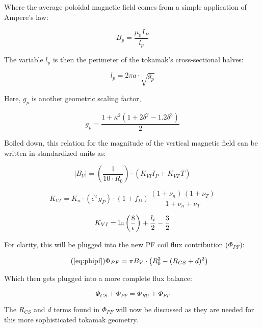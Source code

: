 Where the average poloidal magnetic field comes from a simple application of Ampere's law:

\begin{equation}
	\overline{B_p} = \frac{\mu_0 I_P}{l_p}
\end{equation}

The variable $l_p$ is then the perimeter of the tokamak's cross-sectional halves:

\begin{equation}
	l_p = 2 \pi a \cdot \sqrt{g_p}
\end{equation}

Here, $g_p$ is another geometric scaling factor,

\begin{equation}
  g_p = \frac{1 + \kappa^2 ( 1 + 2 \delta^2 - 1.2\delta^3 )}{2} 
\end{equation}

Boiled down, this relation for the magnitude of the vertical magnetic field can be written in standardized units as:

\begin{equation}
	|B_V| = \left( \frac{ 1 }{ 10 \cdot R_0} \right) \cdot \left( K_{VI} I_P +  K_{VT\,} \overline{T}  \right)
\end{equation}

\begin{equation}
	K_{VT} = K_{n} \cdot ( \epsilon ^ 2 \, g_P ) \cdot ( 1 + f_D ) \, \frac{ (1 + \nu_n) \, (1 + \nu_T) }{1 + \nu_n + \nu_T }
\end{equation}

\begin{equation}
	K_{VI} = \textnormal{ln} \left(\frac{8}{\epsilon}\right) + \frac{l_i}{2} - \frac{3}{2}
\end{equation}

For clarity, this will be plugged into the new PF coil flux contribution ($\Phi_{PF}$):

\begin{equation}
	\tag{\ref{eq:phipf}}
	\Phi_{PF} = \pi B_V \cdot \left( R_0^2 - ( R_{CS} + d ) ^ 2 \right)
\end{equation}

Which then gets plugged into a more complete flux balance:

\begin{equation}
	\label{eq:full_ibal}
	\Phi_{CS} + \Phi_{PF} = \Phi_{RU} + \Phi_{FT}
\end{equation}

The $R_{CS}$ and $d$ terms found in $\Phi_{PF}$ will now be discussed as they are needed for this more sophisticated tokamak geometry.

